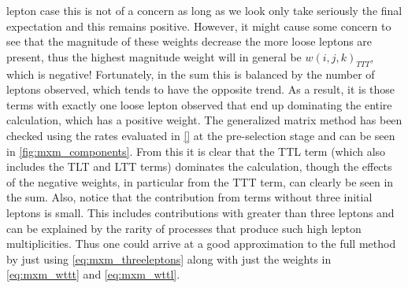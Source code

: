 lepton case this is not of a concern as long as we look only 
take seriously the final expectation and this remains positive.
However, it might cause some concern to see that 
the magnitude of these weights decrease the more loose leptons 
are present, thus the highest magnitude weight
will in general be $w(i,j,k)_{TTT}$, which is negative!
Fortunately, in the sum this is balanced by the number of 
leptons observed, which tends to have the opposite trend.
As a result, it is those terms with exactly one loose lepton
observed that end up dominating the entire calculation, which
has a positive weight. The generalized matrix method has been 
checked using the rates evaluated in \sec\ref{} at the pre-selection stage
and can be seen in \fig\ref{fig:mxm_components}.
From this it is clear that the TTL 
term (which also includes the TLT and LTT terms) 
dominates the calculation,
though the effects of the negative weights, in particular from the TTT
term, can clearly be seen in the sum. Also, notice that the contribution
from terms without three initial leptons is small. This includes contributions
with greater than three leptons and can be explained by the rarity of
processes that produce such high lepton multiplicities.
Thus one could arrive at a good approximation to the full method
by just using \eqn\eqref{eq:mxm_threeleptons} along with just the
weights in \eqn\eqref{eq:mxm_wttt} and \eqref{eq:mxm_wttl}.
